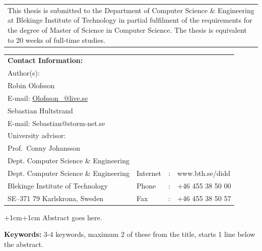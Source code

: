 \documentclass[a4paper,oneside]{bth} %
\begin{document}
		{\pagestyle{empty}
			\changepage{5cm}{1cm}{-0.5cm}{-0.5cm}{}{-2cm}{}{}{}
			\noindent%
			\begin{tabular}{p{\textwidth}}
				{\small This thesis is submitted to the Department of Computer Science \& Engineering at Blekinge Institute of Technology in partial fulfilment of the requirements for the degree of Master of Science in Computer Science. The thesis is equivalent to 20 weeks of full-time studies.}
			\end{tabular}
			\par\vspace {12cm}
			\noindent%
			\begin{tabular}{p{}lcl}
				\textbf{Contact Information:}\\
				Author(s):
				\\
				Robin Olofsson
				\\
				E-mail: \url{Olofsson_@live.se}
				\\
				Sebastian Hultstrand
				\\
				E-mail: Sebastian@storm-net.se
				\\
				\par\vspace {5cm}
				University advisor:
				\\
				Prof.\ Conny Johansson
				\\
				Dept. Computer Science \& Engineering
				\par\vspace {1cm}
				\noindent%
 				\\
				Dept. Computer Science \& Engineering & Internet & : & www.bth.se/didd\\
				Blekinge Institute of Technology & Phone	& : & +46 455 38 50 00 \\
				SE--371 79 Karlskrona, Sweden & Fax & : & +46 455 38 50 57 \\
			\end{tabular}
			\clearpage
		} %

		\setcounter{page}{1}

		\abstract
		\begin{changemargin}{+1cm}{+1cm}
			\noindent
				Abstract goes here.

			\par\vspace {1cm}
			\noindent
			\textbf{Keywords:} 3-4 keywords, maximum 2 of these from the title, starts 1 line below the abstract.
		\end{changemargin}

		\tableofcontents 
		\listoffigures %
\end{document}
